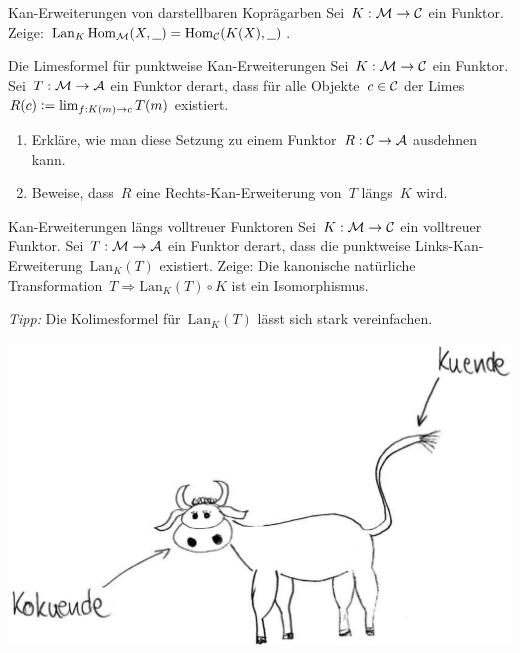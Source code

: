 \documentclass{uebblatt}
\begin{document}

\begin{aufgabe}{Kan-Erweiterungen von darstellbaren Koprägarben}
Sei~$K : \mathcal{M} \to \mathcal{C}$ ein Funktor. Zeige:
$\operatorname{Lan}_K \mathrm{Hom}_{\mathcal{M}}(X, \underline{\ \ }) =
  \mathrm{Hom}_{\mathcal{C}}(K(X), \underline{\ \ })$.
\end{aufgabe}

\begin{aufgabe}{Die Limesformel für punktweise Kan-Erweiterungen}
Sei~$K : \mathcal{M} \to \mathcal{C}$ ein Funktor. Sei~$T : \mathcal{M} \to \mathcal{A}$ ein Funktor derart, dass
für alle Objekte~$c \in \mathcal{C}$ der Limes~$R(c) \vcentcolon= \lim_{f:K(m) \to c} T(m)$
existiert.
\begin{enumerate}
\item Erkläre, wie man diese Setzung zu einem Funktor~$R : \mathcal{C} \to \mathcal{A}$ ausdehnen
kann.
\item Beweise, dass~$R$ eine Rechts-Kan-Erweiterung von~$T$ längs~$K$ wird.
\end{enumerate}
\end{aufgabe}

\begin{aufgabe}{Kan-Erweiterungen längs volltreuer Funktoren}
Sei~$K : \mathcal{M} \to \mathcal{C}$ ein volltreuer Funktor. Sei~$T : \mathcal{M} \to \mathcal{A}$ ein Funktor
derart, dass die punktweise Links-Kan-Erweiterung~$\mathrm{Lan}_K(T)$
existiert. Zeige: Die kanonische natürliche Transformation~$T \Rightarrow
\mathrm{Lan}_K(T) \circ K$ ist ein Isomorphismus.

{\tiny\emph{Tipp:} Die Kolimesformel für~$\mathrm{Lan}_K(T)$ lässt sich stark
vereinfachen.\par}
\end{aufgabe}

\includegraphics{images/kuende}
\end{document}

